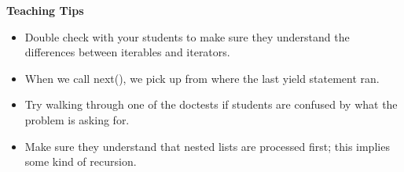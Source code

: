 \begin{guide}
    \textbf{Teaching Tips}
    \begin{itemize}
       \item Double check with your students to make sure they understand the differences between iterables and iterators.
       \item When we call next(), we pick up from where the last yield statement ran.
       \item Try walking through one of the doctests if students are confused by what the problem is asking for.
       \item Make sure they understand that nested lists are processed first; this implies some kind of recursion.
    \end{itemize}
 \end{guide}
